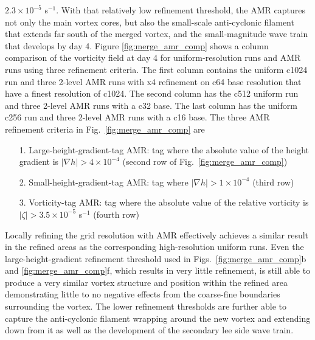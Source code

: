 $2.3 \times 10^{-5}$ s$^{-1}$.  With that relatively low
refinement threshold, the AMR captures not only the main vortex cores,
but also the small-scale anti-cyclonic filament that extends far south
of the merged vortex, and the small-magnitude wave train that develops by
day 4.  Figure
\ref{fig:merge_amr_comp} shows a column comparison of the vorticity
field at day 4 for uniform-resolution runs and AMR runs using three
refinement criteria.  The first column contains the uniform c1024 run
and three 2-level AMR runs with x4 refinement on c64 base resolution
that have a finest resolution of c1024.  The second column has the c512
uniform run and three 2-level AMR runs with a c32 base.  The last column
has the uniform c256 run and three 2-level AMR runs with a c16 base.
The three AMR refinement criteria in 
Fig.~\ref{fig:merge_amr_comp} are
\begin{itemize}
    \item[1.]
        Large-height-gradient-tag AMR:  tag where the absolute value of
        the height gradient is $|\nabla h| > 4 \times 10^{-4}$ (second
        row of Fig.~\ref{fig:merge_amr_comp})
    \item[2.]
        Small-height-gradient-tag AMR:  tag where 
        $|\nabla h| > 1 \times 10^{-4}$ (third row)
    \item[3.]
        Vorticity-tag AMR:  tag where the absolute value of the relative
        vorticity is $| \zeta | > 3.5 \times 10 ^{-5}$ s$^{-1}$ (fourth
        row)
\end{itemize}
Locally refining the grid resolution with AMR effectively achieves a
similar result in the refined areas as the corresponding high-resolution
uniform runs.  Even the large-height-gradient refinement threshold used
in Figs.~\ref{fig:merge_amr_comp}b and
\ref{fig:merge_amr_comp}f, which results in very little refinement, is
still able to produce a very similar vortex structure and position
within the refined area demonstrating little to no negative effects from
the coarse-fine boundaries surrounding the vortex.  The lower refinement
thresholds are further able to capture the anti-cyclonic filament
wrapping around the new vortex and extending down from it as well as the
development of the secondary lee side wave train. 
%
